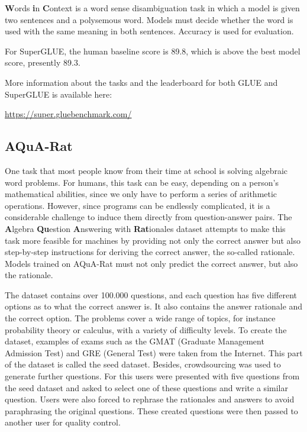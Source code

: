 \documentclass[]{krantz}
\begin{document}
\textbf{W}ords \textbf{i}n \textbf{C}ontext is a word sense disambiguation task in which a model is given two sentences and a polysemous word. Models must decide whether the word is used with the same meaning in both sentences. Accuracy is used for evaluation.

\citep{wang2019superglue}

For SuperGLUE, the human baseline score is 89.8, which is above the best model score, presently 89.3.

More information about the tasks and the leaderboard for both GLUE and SuperGLUE is available here:

\center \url{https://super.gluebenchmark.com/}

\flushleft

\hypertarget{aqua-rat}{%
\subsection{AQuA-Rat}\label{aqua-rat}}

One task that most people know from their time at school is solving algebraic word problems. For humans, this task can be easy, depending on a person's mathematical abilities, since we only have to perform a series of arithmetic operations. However, since programs can be endlessly complicated, it is a considerable challenge to induce them directly from question-answer pairs. The \textbf{A}lgebra \textbf{Qu}estion \textbf{A}nswering with \textbf{Rat}ionales dataset attempts to make this task more feasible for machines by providing not only the correct answer but also step-by-step instructions for deriving the correct answer, the so-called rationale. Models trained on AQuA-Rat must not only predict the correct answer, but also the rationale.

The dataset contains over 100.000 questions, and each question has five different options as to what the correct answer is. It also contains the answer rationale and the correct option. The problems cover a wide range of topics, for instance probability theory or calculus, with a variety of difficulty levels. To create the dataset, examples of exams such as the GMAT (Graduate Management Admission Test) and GRE (General Test) were taken from the Internet. This part of the dataset is called the seed dataset.
Besides, crowdsourcing was used to generate further questions. For this users were presented with five questions from the seed dataset and asked to select one of these questions and write a similar question. Users were also forced to rephrase the rationales and answers to avoid paraphrasing the original questions.
These created questions were then passed to another user for quality control.
\end{document}
